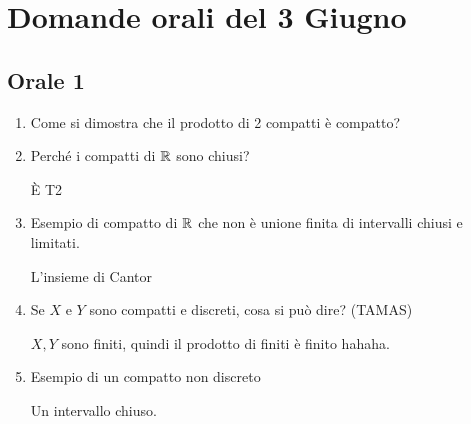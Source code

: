 \documentclass[]{article}
\begin{document}
\clearpage
\section{Domande orali del 3 Giugno}

\subsection{Orale 1}
\begin{enumerate}
    \item Come si dimostra che il prodotto di 2 compatti \`e compatto? 
    \item Perch\'e i compatti di $\mathbb{R}$ sono chiusi?
           \begin{answer}
            \`E T2
           \end{answer} 
    \item Esempio di compatto di $\mathbb{R}$ che non \`e unione finita di intervalli chiusi e limitati.  
        \begin{answer}
            L'insieme di Cantor
        \end{answer}
    \item Se $X$ e $Y$ sono compatti e discreti, cosa si pu\`o dire? (TAMAS)
        \begin{answer}
            $X, Y$ sono finiti, quindi il prodotto di finiti \`e finito hahaha.
        \end{answer}
    \item Esempio di un compatto non discreto
        \begin{answer}
            Un intervallo chiuso.
        \end{answer}
\end{enumerate}
\end{document}
